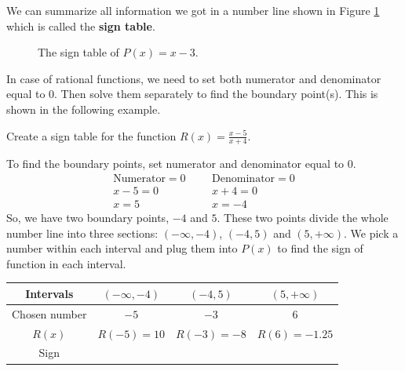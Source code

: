 We can summarize all information we got in a number line shown in Figure \ref{fig:ST_ex} which is called the \textbf{sign table}.
\begin{figure}[ht]   
    \centering
    \caption{The sign table of $P(x)=x-3$.}
    \label{fig:ST_ex}
\end{figure}
\begin{nt}
    In case of rational functions, we need to set both numerator and denominator equal to 0. Then solve them separately to find the boundary point(s). This is shown in the following example.
\end{nt}
\begin{exa}
    Create a sign table for the function $\displaystyle R(x) = \frac{x-5}{x+4}$.
\end{exa}
To find the boundary points, set numerator and denominator equal to 0.
\begin{align*}
        \text{Numerator}=0&       &       &\text{Denominator}=0 \\
        x-5 =0&                     &       &x+4=0\\
        x=5&                        &       &x=-4
\end{align*}    
So, we have two boundary points, $-4$ and $5$. These two points divide the whole number line into three sections: $(-\infty,-4)$, $(-4,5)$ and $(5,+\infty)$. We pick a number within each interval and plug them into $P(x)$ to find the sign of function in each interval.
\begin{table}[ht]
\centering
\begin{tabular}{c || c  c  c }
    \toprule
    Intervals     & $(-\infty,-4)$   & $(-4,5)$  & $(5,+\infty)$\\[1.5pt]
    \hline \hline
    Chosen number & $-5$         &  $-3$      &   $6$ \\
    $R(x)$        & $R(-5)=10$  & $R(-3)=-8$ & $R(6)=-1.25$ \\[1.5pt]
    Sign          &\circled{$+$} &\circled{$-$}&\circled{$+$}
\end{tabular}
\end{table}


